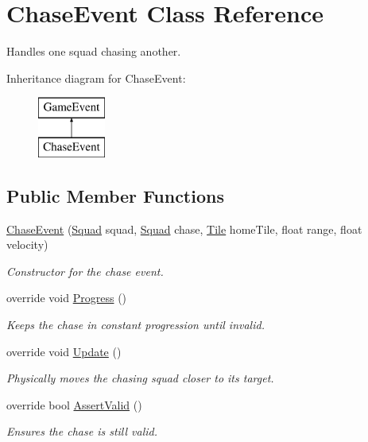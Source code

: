 \hypertarget{class_chase_event}{}\section{Chase\+Event Class Reference}
\label{class_chase_event}


Handles one squad chasing another.  


Inheritance diagram for Chase\+Event\+:\begin{figure}[H]
\begin{center}
\leavevmode
\includegraphics[height=2.000000cm]{class_chase_event}
\end{center}
\end{figure}
\subsection*{Public Member Functions}
\begin{DoxyCompactItemize}
\item 
\hyperlink{class_chase_event_a451a00af93b1347a485e244739ceb994}{Chase\+Event} (\hyperlink{class_squad}{Squad} squad, \hyperlink{class_squad}{Squad} chase, \hyperlink{class_tile}{Tile} home\+Tile, float range, float velocity)
\begin{DoxyCompactList}\small\item\em Constructor for the chase event. \end{DoxyCompactList}\item 
override void \hyperlink{class_chase_event_a60d3a6a970fddc85e47adc5d2652a5bd}{Progress} ()
\begin{DoxyCompactList}\small\item\em Keeps the chase in constant progression until invalid. \end{DoxyCompactList}\item 
override void \hyperlink{class_chase_event_a6197d2cdf001ae96cc2f2e4996cbcd89}{Update} ()
\begin{DoxyCompactList}\small\item\em Physically moves the chasing squad closer to its target. \end{DoxyCompactList}\item 
override bool \hyperlink{class_chase_event_a78ff05e24a0671c734d0c4f50effa88b}{Assert\+Valid} ()
\begin{DoxyCompactList}\small\item\em Ensures the chase is still valid. \end{DoxyCompactList}\end{DoxyCompactItemize}
